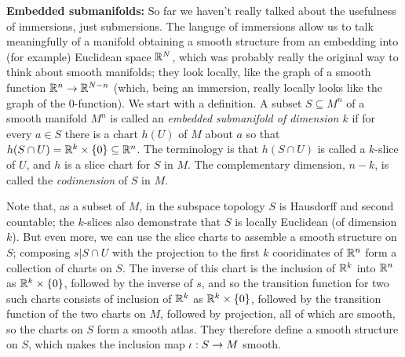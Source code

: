 {\bf Embedded submanifolds:} So far we haven't really talked about the usefulness of immersions, just submersions. 
The languge of immersions allow us to talk meaningfully of a manifold obtaining a
smooth structure from an embedding into (for example) Euclidean space ${\Bbb R}^N$, which was
probably really the original way to think about smooth manifolds; they look locally,
like the graph of a smooth function ${\Bbb R}^n\rightarrow {\Bbb R}^{N-n}$ (which, being an immersion,
really locally looks like the graph of the $0$-function). We start with a definition.
A subset $S\subseteq M^n$ of a smooth manifold $M^n$ is called an {\it embedded submanifold
of dimension $k$} if for every $a\in S$ there is a chart $h(U)$ of $M$ about $a$ so that
$h(S\cap U)={\Bbb R}^k\times \{0\}\subseteq {\Bbb R}^n$. The terminology is that $h(S\cap U)$
is called a $k$-slice of $U$, and $h$ is a slice chart for $S$ in $M$. The complementary
dimension, $n-k$, is called the {\it codimension} of $S$ in $M$.

Note that, as a subset of 
$M$, in the subspace topology $S$ is Hausdorff and second countable; the $k$-slices also
demonstrate that $S$ is locally Euclidean (of dimension $k$). But even more, 
we can use
the slice charts to assemble a smooth structure on $S$; composing $s|{S\cap U}$ with the projection
to the first $k$ cooridinates of ${\Bbb R}^n$ form a collection of charts on $S$. The
inverse of this chart is the inclusion of ${\Bbb R}^k$ into ${\Bbb R}^n$ as ${\Bbb R}^k\times \{0\}$, followed
by the inverse of $s$, and so the transition function for two such charts consists of
inclusion of ${\Bbb R}^k$ as ${\Bbb R}^k\times\{0\}$, followed by the transition 
function of the two charts on $M$, followed by projection,
all of which are smooth, so the charts on $S$ form a smooth atlas. They therefore define
a smooth structure on $S$, which makes the inclusion map $\iota:S\rightarrow M$ smooth. 

